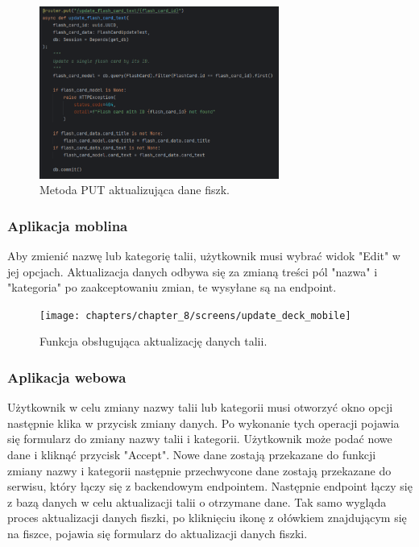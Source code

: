 \begin{figure}[H]
    \centering
    \includegraphics[width=0.7\textwidth]{chapters/chapter_8/screens/update_flash_card_text_backend}
    \caption{Metoda PUT aktualizująca dane fiszk.}
    \label{img:update_flash_card_backend}
\end{figure}

\subsubsection{Aplikacja moblina}

Aby zmienić nazwę lub kategorię talii, użytkownik musi wybrać widok "Edit" w jej opcjach. Aktualizacja danych odbywa się za zmianą treści pól "nazwa" i "kategoria" po zaakceptowaniu zmian, te wysyłane są na endpoint.

\begin{figure}[H]
    \centering
    \texttt{[image: chapters/chapter\_8/screens/update\_deck\_mobile]}
    \caption{Funkcja obsługująca aktualizację danych talii.}
    \label{img:update_deck_mobile}
\end{figure}

\subsubsection{Aplikacja webowa}

Użytkownik w celu zmiany nazwy talii lub kategorii musi otworzyć okno opcji następnie klika w przycisk zmiany danych. Po wykonanie tych operacji pojawia się formularz do zmiany nazwy talii i kategorii. Użytkownik może podać nowe dane i kliknąć przycisk "Accept". Nowe dane zostają przekazane do funkcji zmiany nazwy i kategorii następnie przechwycone dane zostają przekazane do serwisu, który łączy się z backendowym endpointem. Następnie endpoint łączy się z bazą danych w celu aktualizacji talii o otrzymane dane. Tak samo wygląda proces aktualizacji danych fiszki, po kliknięciu ikonę z ołówkiem znajdującym się na fiszce, pojawia się formularz do aktualizacji danych fiszki.

